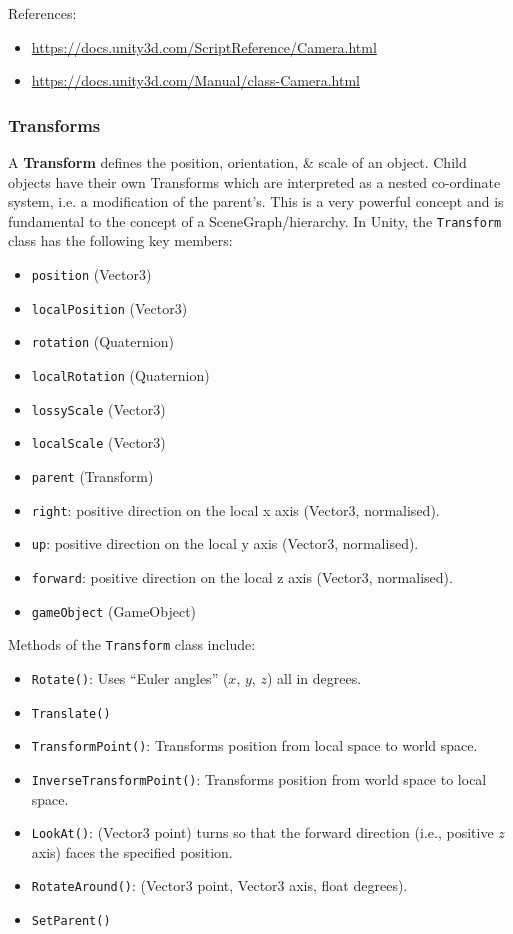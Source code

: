 \documentclass[a4paper,11pt]{article}
\begin{document}
References:
\begin{itemize}
    \item   \url{https://docs.unity3d.com/ScriptReference/Camera.html}
    \item   \url{https://docs.unity3d.com/Manual/class-Camera.html}
\end{itemize}

\subsubsection{Transforms}
A \textbf{Transform} defines the position, orientation, \& scale of an object. 
Child objects have their own Transforms which are interpreted as a nested co-ordinate system, i.e. a modification of the
parent's.
This is a very powerful concept and is fundamental to the concept of a SceneGraph/hierarchy.
In Unity, the \verb|Transform| class has the following key members: 
\begin{itemize}
    \item   \verb|position| (Vector3)
    \item   \verb|localPosition| (Vector3)
    \item   \verb|rotation| (Quaternion)
    \item   \verb|localRotation| (Quaternion)
    \item   \verb|lossyScale| (Vector3)
    \item   \verb|localScale| (Vector3)
    \item   \verb|parent| (Transform)
    \item   \verb|right|: positive direction on the local x axis (Vector3, normalised).
    \item   \verb|up|: positive direction on the local y axis (Vector3, normalised).
    \item   \verb|forward|: positive direction on the local z axis (Vector3, normalised).
    \item   \verb|gameObject| (GameObject)
\end{itemize}

Methods of the \verb|Transform| class include:
\begin{itemize}
    \item   \verb|Rotate()|: Uses ``Euler angles'' ($x$, $y$, $z$) all in degrees.
    \item   \verb|Translate()|
    \item   \verb|TransformPoint()|: Transforms position from local space to world space.
    \item   \verb|InverseTransformPoint()|: Transforms position from world space to local space.
    \item   \verb|LookAt()|: (Vector3 point) turns so that the forward direction (i.e., positive $z$ axis) faces the specified 
            position.
    \item   \verb|RotateAround()|: (Vector3 point, Vector3 axis, float degrees).
    \item   \verb|SetParent()|
\end{itemize}
\end{document}
